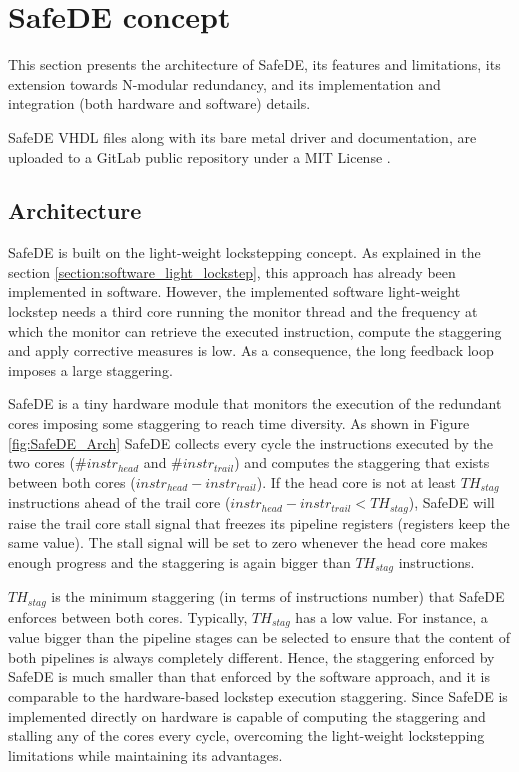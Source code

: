 \clearpage
\newpage
\section{SafeDE concept}

This section presents the architecture of SafeDE, its features and limitations, its extension towards N-modular redundancy, and its implementation and integration (both hardware and software) details.

SafeDE VHDL files along with its bare metal driver and documentation, are uploaded to a GitLab public repository under a MIT License \cite{SafeDEgit}.

\subsection{Architecture}

SafeDE is built on the light-weight lockstepping concept. As explained in the section \ref{section:software_light_lockstep}, this approach has already been implemented in software. However, the implemented software light-weight lockstep needs a third core running the monitor thread and the frequency at which the monitor can retrieve the executed instruction, compute the staggering and apply corrective measures is low. As a consequence, the long feedback loop imposes a large staggering. 

SafeDE is a tiny hardware module that monitors the execution of the redundant cores imposing some staggering to reach time diversity. As shown in Figure \ref{fig:SafeDE_Arch} SafeDE collects every cycle the instructions executed by the two cores ($\#instr_{head}$ and $\#instr_{trail}$) and computes the staggering that exists between both cores ($instr_{head} - instr_{trail}$). If the head core is not at least $TH_{stag}$ instructions ahead of the trail core ($instr_{head} - instr_{trail} < TH_{stag}$), SafeDE will raise the trail core stall signal that freezes its pipeline registers (registers keep the same value). The stall signal will be set to zero whenever the head core makes enough progress and the staggering is again bigger than $TH_{stag}$ instructions.

$TH_{stag}$ is the minimum staggering (in terms of instructions number) that SafeDE enforces between both cores. Typically, $TH_{stag}$ has a low value. For instance, a value bigger than the pipeline stages can be selected to ensure that the content of both pipelines is always completely different. Hence, the staggering enforced by SafeDE is much smaller than that enforced by the software approach, and it is comparable to the hardware-based lockstep execution staggering. Since SafeDE is implemented directly on hardware is capable of computing the staggering and stalling any of the cores every cycle, overcoming the light-weight lockstepping limitations while maintaining its advantages.

